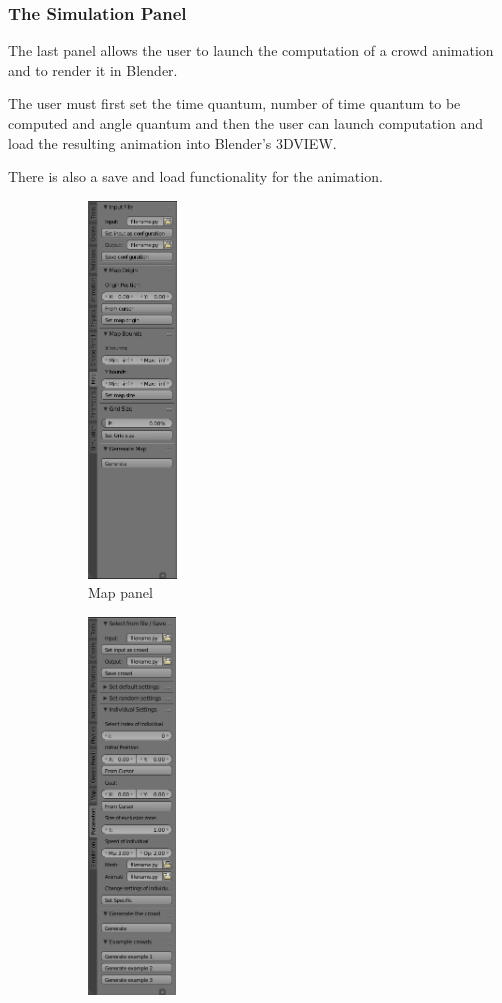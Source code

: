 \subsubsection{The Simulation Panel} 

The last panel allows the user to launch the computation of a crowd
animation and to render it in Blender.

The user must first set the time quantum, number of time quantum to be
computed and angle quantum and then the user can launch
computation and load the resulting animation into Blender's 3DVIEW.


There is also a save and load functionality for the animation.

\begin{figure} \centering
  \begin{subfigure}[t]{0.2\textwidth}
    \includegraphics[height=10cm]{img/GUI_map_example.png}
    \caption{Map panel}
  \end{subfigure} %
  \begin{subfigure}[t]{0.2\textwidth}
    \includegraphics[height=10cm]{img/GUI_crowd_example.png}

\end{subfigure}
\end{figure}
